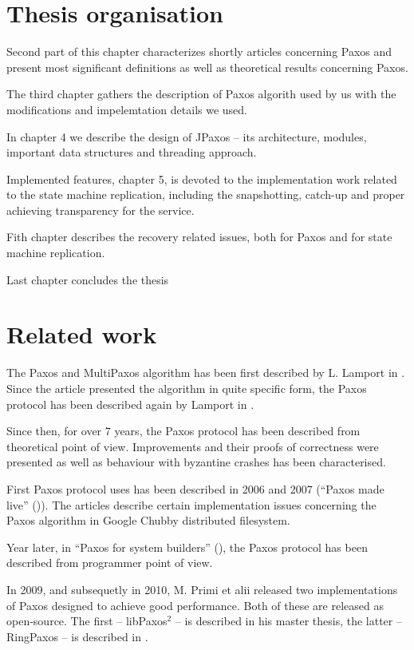 \section{Thesis organisation}
Second part of this chapter characterizes shortly articles concerning Paxos and present most significant definitions as well as theoretical results concerning Paxos.

The third chapter gathers the description of Paxos algorith used by us with the modifications and impelemtation details we used.

In chapter 4 we describe the design of JPaxos -- its architecture, modules, important data structures and threading approach.

Implemented features, chapter 5, is devoted to the implementation work related to the state machine replication, including the snapshotting, catch-up and proper achieving transparency for the service.

Fith chapter describes the recovery related issues, both for Paxos and for state machine replication.

Last chapter concludes the thesis %

\section{Related work}

The Paxos and MultiPaxos algorithm has been first described by L. Lamport in \cite{Lam98}. Since the article presented the algorithm in quite specific form, the Paxos protocol has been described again by Lamport in \cite{Lam01}.

Since then, for over 7 years, the Paxos protocol has been described from theoretical point of view. Improvements and their proofs of correctness were presented as well as behaviour with byzantine crashes has been characterised.

First Paxos protocol uses has been described in 2006 and 2007 (``Paxos made live'' (\cite{CGR07})). The articles describe certain implementation issues concerning the Paxos algorithm in Google Chubby distributed filesystem.

Year later, in ``Paxos for system builders'' (\cite{AK08}), the Paxos protocol has been described from programmer point of view.

In 2009, and subsequetly in 2010, M. Primi et alii released two implementations of Paxos designed to achieve good performance. Both of these are released as open-source. The first -- libPaxos$^2$ -- is described in his master thesis, the latter -- RingPaxos -- is described in \cite{Mar10}.

